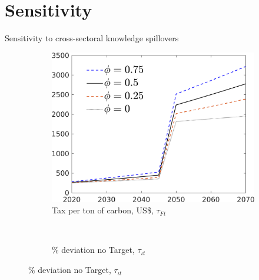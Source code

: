 \documentclass[11pt,aspectratio=169]{beamer}
\begin{document}
\section*{Sensitivity}

\begin{frame}{Sensitivity to cross-sectoral knowledge spillovers}
\hypertarget{sensphi}{}
\vspace{-3mm}
\begin{figure}[h!!]
	
	\begin{subfigure}{0.45\textwidth}		
		\caption{Tax per ton of carbon,  US\$, $\tau_{Ft}$}
		\includegraphics[width=1\textwidth]{../codding_model/own_basedOnFried/optimalPol_010922_revision/figures/all_13Sept22/Phi_SensN_Tauf_spillover0_knspil0_xgr0_nsk0_sep0_extern0_PV1_etaa0.79_lgd1.png}
	\end{subfigure}	
	\begin{minipage}[]{0.05\textwidth}
		\ 
	\end{minipage}
\begin{subfigure}{0.45\textwidth}		
\caption{ \% deviation no Target, $\tau_{\iota t}$}

\end{subfigure}
\end{figure}
\end{frame}
\end{document}
